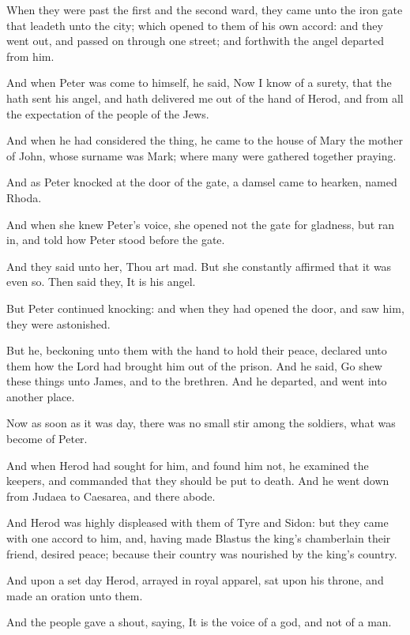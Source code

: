 \Verse When they were past the first and the second ward, they came unto the iron gate that leadeth unto the city; which opened to them of his own accord: and they went out, and passed on through one street; and forthwith the angel departed from him.

\Verse And when Peter was come to himself, he said, Now I know of a surety, that the \LORD hath sent his angel, and hath delivered me out of the hand of Herod, and from all the expectation of the people of the Jews.

\Verse And when he had considered the thing, he came to the house of Mary the mother of John, whose surname was Mark; where many were gathered together praying.

\Verse And as Peter knocked at the door of the gate, a damsel came to hearken, named Rhoda.

\Verse And when she knew Peter's voice, she opened not the gate for gladness, but ran in, and told how Peter stood before the gate.

\Verse And they said unto her, Thou art mad. But she constantly affirmed that it was even so. Then said they, It is his angel.

\Verse But Peter continued knocking: and when they had opened the door, and saw him, they were astonished.

\Verse But he, beckoning unto them with the hand to hold their peace, declared unto them how the Lord had brought him out of the prison. And he said, Go shew these things unto James, and to the brethren. And he departed, and went into another place.

\Verse Now as soon as it was day, there was no small stir among the soldiers, what was become of Peter.

\Verse And when Herod had sought for him, and found him not, he examined the keepers, and commanded that they should be put to death.  And he went down from Judaea to Caesarea, and there abode.

\Verse And Herod was highly displeased with them of Tyre and Sidon: but they came with one accord to him, and, having made Blastus the king's chamberlain their friend, desired peace; because their country was nourished by the king's country.

\Verse And upon a set day Herod, arrayed in royal apparel, sat upon his throne, and made an oration unto them.

\Verse And the people gave a shout, saying, It is the voice of a god, and not of a man.

